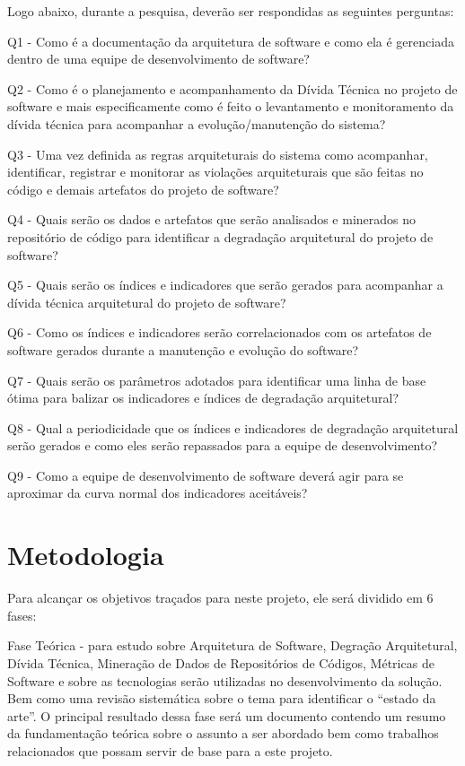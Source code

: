 \documentclass[
	12pt,				%
	openright,			%
	twoside,			%
	a4paper,			%
	english,			%
	french,				%
	spanish,			%
	brazil,				%
	]{abntex2}
\begin{document}

Logo abaixo, durante a pesquisa, deverão ser respondidas as seguintes
perguntas:

Q1 - Como é a documentação da arquitetura de software e como ela é
gerenciada dentro de uma equipe de desenvolvimento de software?

Q2 - Como é o planejamento e acompanhamento da Dívida Técnica no projeto
de software e mais especificamente como é feito o levantamento e monitoramento
da dívida técnica para acompanhar a evolução/manutenção do sistema?

Q3 - Uma vez definida as regras arquiteturais do sistema como acompanhar,
identificar, registrar e monitorar as violações arquiteturais que
são feitas no código e demais artefatos do projeto de software? 

Q4 - Quais serão os dados e artefatos que serão analisados e minerados
no repositório de código para identificar a degradação arquitetural
do projeto de software?

Q5 - Quais serão os índices e indicadores que serão gerados para acompanhar
a dívida técnica arquitetural do projeto de software?

Q6 - Como os índices e indicadores serão correlacionados com os artefatos
de software gerados durante a manutenção e evolução do software?

Q7 - Quais serão os parâmetros adotados para identificar uma linha
de base ótima para balizar os indicadores e índices de degradação
arquitetural?

Q8 - Qual a periodicidade que os índices e indicadores de degradação
arquitetural serão gerados e como eles serão repassados para a equipe
de desenvolvimento?

Q9 - Como a equipe de desenvolvimento de software deverá agir para
se aproximar da curva normal dos indicadores aceitáveis?

\chapter{Metodologia}

Para alcançar os objetivos traçados para neste projeto, ele será dividido
em 6 fases: 

Fase Teórica - para estudo sobre Arquitetura de Software, Degração
Arquitetural, Dívida Técnica, Mineração de Dados de Repositórios de
Códigos, Métricas de Software e sobre as tecnologias serão utilizadas
no desenvolvimento da solução. Bem como uma revisão sistemática sobre
o tema para identificar o \textquotedblleft estado da arte\textquotedblright .
O principal resultado dessa fase será um documento contendo um resumo
da fundamentação teórica sobre o assunto a ser abordado bem como trabalhos
relacionados que possam servir de base para a este projeto. 
\end{document}
